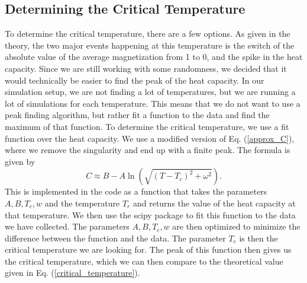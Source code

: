 \documentclass[twocolumn,a4paper,aps,amsmath,amssymb,floatfix,superscriptaddress]{revtex4-2}
\begin{document}
        \subsection{Determining the Critical Temperature}
            To determine the critical temperature, there are a few options. As given in the theory, the two major events happening at this temperature is the switch of the absolute value of the average magnetization from 1 to 0, and the spike in the heat capacity. Since we are still working with some randomness, we decided that it would technically be easier to find the peak of the heat capacity. 
            In our simulation setup, we are not finding a lot of temperatures, but we are running a lot of simulations for each temperature. This means that we do not want to use a peak finding algorithm, but rather fit a function to the data and find the maximum of that function. To determine the critical temperature, we use a fit function over the heat capacity. We use a modified version of Eq. (\ref{approx_C}), where we remove the singularity and end up with a finite peak. The formula is given by
            \begin{equation}
                C \approx B - A\ln(\sqrt{(T - T_c)^2 + \omega^2}). \label{fit_C}
            \end{equation}
            This is implemented in the code as a function that takes the parameters $A, B, T_c, w$ and the temperature $T_r$ and returns the value of the heat capacity at that temperature. We then use the scipy package to fit this function to the data we have collected. The parameters $A, B, T_c, w$ are then optimized to minimize the difference between the function and the data. The parameter $T_c$ is then the critical temperature we are looking for. The peak of this function then gives us the critical temperature, which we can then compare to the theoretical value given in Eq. (\ref{critical_temperature}).
\end{document}
